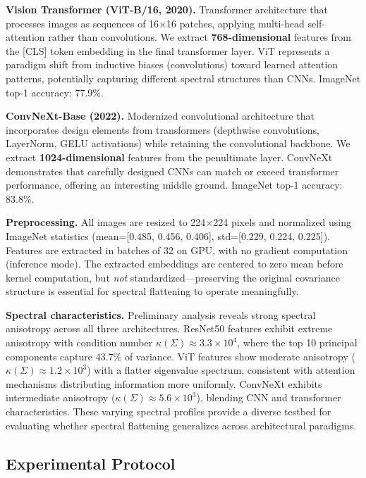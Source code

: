 \documentclass[11pt]{article}
\begin{document}
\textbf{Vision Transformer (ViT-B/16, 2020).} Transformer architecture \cite{dosovitskiy2020image} that processes images as sequences of 16$\times$16 patches, applying multi-head self-attention rather than convolutions. We extract \textbf{768-dimensional} features from the [CLS] token embedding in the final transformer layer. ViT represents a paradigm shift from inductive biases (convolutions) toward learned attention patterns, potentially capturing different spectral structures than CNNs. ImageNet top-1 accuracy: 77.9\%.

\textbf{ConvNeXt-Base (2022).} Modernized convolutional architecture \cite{liu2022convnet} that incorporates design elements from transformers (depthwise convolutions, LayerNorm, GELU activations) while retaining the convolutional backbone. We extract \textbf{1024-dimensional} features from the penultimate layer. ConvNeXt demonstrates that carefully designed CNNs can match or exceed transformer performance, offering an interesting middle ground. ImageNet top-1 accuracy: 83.8\%.

\textbf{Preprocessing.} All images are resized to 224$\times$224 pixels and normalized using ImageNet statistics (mean=[0.485, 0.456, 0.406], std=[0.229, 0.224, 0.225]). Features are extracted in batches of 32 on GPU, with no gradient computation (inference mode). The extracted embeddings are centered to zero mean before kernel computation, but \emph{not} standardized---preserving the original covariance structure is essential for spectral flattening to operate meaningfully.

\textbf{Spectral characteristics.} Preliminary analysis reveals strong spectral anisotropy across all three architectures. ResNet50 features exhibit extreme anisotropy with condition number $\kappa(\Sigma) \approx 3.3 \times 10^4$, where the top 10 principal components capture 43.7\% of variance. ViT features show moderate anisotropy ($\kappa(\Sigma) \approx 1.2 \times 10^3$) with a flatter eigenvalue spectrum, consistent with attention mechanisms distributing information more uniformly. ConvNeXt exhibits intermediate anisotropy ($\kappa(\Sigma) \approx 5.6 \times 10^3$), blending CNN and transformer characteristics. These varying spectral profiles provide a diverse testbed for evaluating whether spectral flattening generalizes across architectural paradigms.

\subsection{Experimental Protocol}
\end{document}
